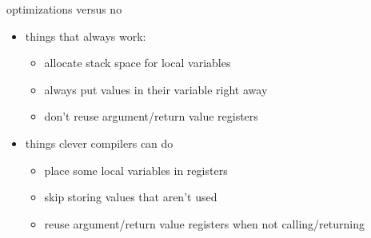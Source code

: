 \begin{frame}{optimizations versus no}
    \begin{itemize}
    \item things that always work:
        \begin{itemize}
        \item allocate stack space for local variables
        \item always put values in their variable right away
        \item don't reuse argument/return value registers
        \end{itemize}
    \item things clever compilers can do
        \begin{itemize}
        \item place some local variables in registers
        \item skip storing values that aren't used
        \item reuse argument/return value registers when not calling/returning
        \end{itemize}
    \end{itemize}
\end{frame}
